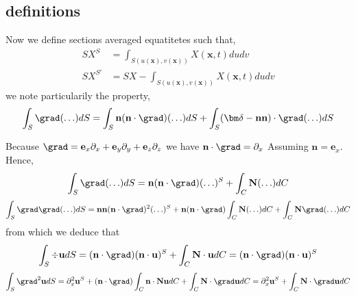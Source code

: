 \subsection{definitions}
Now we define sections averaged equatitetes such that,
\begin{align*}
    S X^S &= \int_{S(u(\textbf{x}),v(\textbf{x}))} X(\textbf{x},t)dudv\\
    S X^{S'} &=S  X - \int_{S(u(\textbf{x}),v(\textbf{x}))} X(\textbf{x},t)dudv
\end{align*}
we note particularily the property,
\begin{equation}
    \int_S \grad (\ldots) dS 
    = 
    \int_S \textbf{n} (\textbf{n}\cdot \grad) (\ldots) dS 
    + \int_S (\bm\delta -\textbf{n} \textbf{n})\cdot \grad (\ldots) dS 
\end{equation}

Because $\grad = \textbf{e}_x \partial_x+ \textbf{e}_y \partial_y+\textbf{e}_z \partial_z$ we have $\textbf{n}\cdot \grad = \partial_x$ Assuming $\textbf{n}=\textbf{e}_x$.
Hence,
\begin{equation}
    \int_S \grad (\ldots) dS 
    = 
    \textbf{n} (\textbf{n}\cdot \grad)  (\ldots)^S
    + \int_C \textbf{N} (\ldots) dC
\end{equation}
\begin{equation}
    \int_S \grad \grad (\ldots) dS 
    = 
    \textbf{nn} (\textbf{n}\cdot \grad)^2  (\ldots)^S
    +\textbf{n} (\textbf{n}\cdot \grad) \int_C \textbf{N} (\ldots) dC
    + \int_C \textbf{N} \grad (\ldots) dC
\end{equation}
from which  we deduce that 
\begin{equation}
    \int_S \div \textbf{u} dS 
    = 
    (\textbf{n}\cdot \grad)  (\textbf{n} \cdot \textbf{u})^S
    + \int_C \textbf{N} \cdot \textbf{u}dC
    =
    (\textbf{n}\cdot \grad)  (\textbf{n} \cdot \textbf{u})^S
\end{equation}
\begin{equation}
    \int_S \grad^2 \textbf{u} dS 
    = 
    \partial_x^2  \textbf{u}^S
    +(\textbf{n}\cdot \grad) \int_C \textbf{n} \cdot \textbf{N} \textbf{u} dC
    + \int_C \textbf{N}\cdot  \grad \textbf{u} dC
    =
    \partial_x^2  \textbf{u}^S
    + \int_C \textbf{N}\cdot  \grad \textbf{u} dC
\end{equation}
